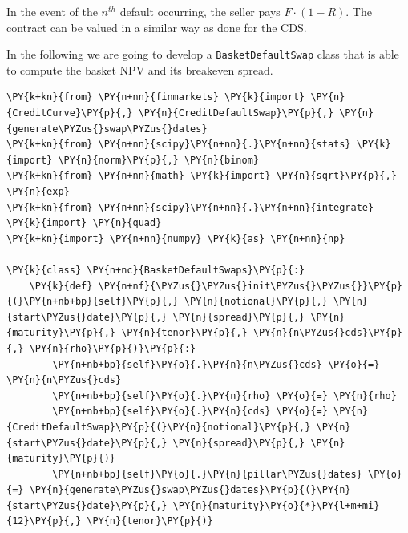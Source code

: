 In the event of the $n^{th}$ default occurring, the seller pays
\(F\cdot(1-R)\). The contract can be valued in a similar way as done for the CDS.

In the following we are going to develop a \texttt{BasketDefaultSwap} class that is able to compute the basket NPV and its breakeven spread.

\begin{tcolorbox}[breakable, size=fbox, boxrule=1pt, pad at break*=1mm,colback=cellbackground, colframe=cellborder]
\begin{Verbatim}[commandchars=\\\{\}]
\PY{k+kn}{from} \PY{n+nn}{finmarkets} \PY{k}{import} \PY{n}{CreditCurve}\PY{p}{,} \PY{n}{CreditDefaultSwap}\PY{p}{,} \PY{n}{generate\PYZus{}swap\PYZus{}dates}
\PY{k+kn}{from} \PY{n+nn}{scipy}\PY{n+nn}{.}\PY{n+nn}{stats} \PY{k}{import} \PY{n}{norm}\PY{p}{,} \PY{n}{binom}
\PY{k+kn}{from} \PY{n+nn}{math} \PY{k}{import} \PY{n}{sqrt}\PY{p}{,} \PY{n}{exp}
\PY{k+kn}{from} \PY{n+nn}{scipy}\PY{n+nn}{.}\PY{n+nn}{integrate} \PY{k}{import} \PY{n}{quad}
\PY{k+kn}{import} \PY{n+nn}{numpy} \PY{k}{as} \PY{n+nn}{np}
		
\PY{k}{class} \PY{n+nc}{BasketDefaultSwaps}\PY{p}{:}
    \PY{k}{def} \PY{n+nf}{\PYZus{}\PYZus{}init\PYZus{}\PYZus{}}\PY{p}{(}\PY{n+nb+bp}{self}\PY{p}{,} \PY{n}{notional}\PY{p}{,} \PY{n}{start\PYZus{}date}\PY{p}{,} \PY{n}{spread}\PY{p}{,} \PY{n}{maturity}\PY{p}{,} \PY{n}{tenor}\PY{p}{,} \PY{n}{n\PYZus{}cds}\PY{p}{,} \PY{n}{rho}\PY{p}{)}\PY{p}{:}
        \PY{n+nb+bp}{self}\PY{o}{.}\PY{n}{n\PYZus{}cds} \PY{o}{=} \PY{n}{n\PYZus{}cds}
        \PY{n+nb+bp}{self}\PY{o}{.}\PY{n}{rho} \PY{o}{=} \PY{n}{rho}
        \PY{n+nb+bp}{self}\PY{o}{.}\PY{n}{cds} \PY{o}{=} \PY{n}{CreditDefaultSwap}\PY{p}{(}\PY{n}{notional}\PY{p}{,} \PY{n}{start\PYZus{}date}\PY{p}{,} \PY{n}{spread}\PY{p}{,} \PY{n}{maturity}\PY{p}{)}
        \PY{n+nb+bp}{self}\PY{o}{.}\PY{n}{pillar\PYZus{}dates} \PY{o}{=} \PY{n}{generate\PYZus{}swap\PYZus{}dates}\PY{p}{(}\PY{n}{start\PYZus{}date}\PY{p}{,} \PY{n}{maturity}\PY{o}{*}\PY{l+m+mi}{12}\PY{p}{,} \PY{n}{tenor}\PY{p}{)} 
		

\end{Verbatim}
\end{tcolorbox}

